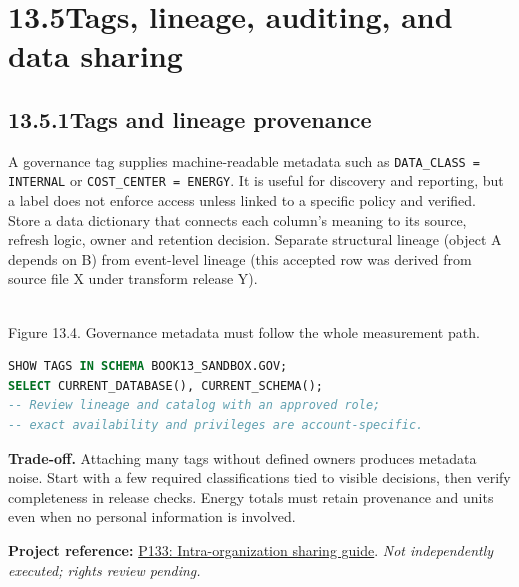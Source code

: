 \documentclass[11pt,twoside]{article}
\newcommand{\topic}[2]{\subsection*{#1\quad #2}}
\newcommand{\repo}[2]{\par\begingroup\fontsize{8.0}{9.6}\selectfont\sffamily\color{inkgray}\textbf{Project reference:} \href{#2}{#1}. \textit{Not independently executed; rights review pending.}\par\endgroup}
\begin{document}
\section*{13.5\quad Tags, lineage, auditing, and data sharing}
\topic{13.5.1}{Tags and lineage provenance}
A governance tag supplies machine-readable metadata such as \texttt{DATA\_CLASS = INTERNAL} or \texttt{COST\_CENTER = ENERGY}. It is useful for discovery and reporting, but a label does not enforce access unless linked to a specific policy and verified. Store a data dictionary that connects each column's meaning to its source, refresh logic, owner and retention decision. Separate structural lineage (object A depends on B) from event-level lineage (this accepted row was derived from source file X under transform release Y).
\begin{center}\\{\fontsize{8}{9}\selectfont\color{inkgray}Figure 13.4. Governance metadata must follow the whole measurement path.}\end{center}
\begin{lstlisting}[language=SQL,caption={Metadata inventory to support a governed review.}]
SHOW TAGS IN SCHEMA BOOK13_SANDBOX.GOV;
SELECT CURRENT_DATABASE(), CURRENT_SCHEMA();
-- Review lineage and catalog with an approved role;
-- exact availability and privileges are account-specific.
\end{lstlisting}
\textbf{Trade-off.} Attaching many tags without defined owners produces metadata noise. Start with a few required classifications tied to visible decisions, then verify completeness in release checks. Energy totals must retain provenance and units even when no personal information is involved.
\repo{P133: Intra-organization sharing guide}{https://github.com/Snowflake-Labs/sfguide-horizon-intra-organization-sharing}
\end{document}
